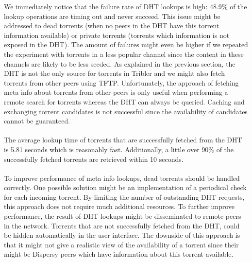 We immediately notice that the failure rate of DHT lookups is high: 48.9\% of the lookup operations are timing out and never succeed. This issue might be addressed to dead torrents (when no peers in the DHT have this torrent information available) or private torrents (torrents which information is not exposed in the DHT). The amount of failures might even be higher if we repeated the experiment with torrents in a less popular channel since the content in these channels are likely to be less seeded. As explained in the previous section, the DHT is not the only source for torrents in Tribler and we might also fetch torrents from other peers using TFTP. Unfortunately, the approach of fetching meta info about torrents from other peers is only useful when performing a remote search for torrents whereas the DHT can always be queried. Caching and exchanging torrent candidates is not successful since the availability of candidates cannot be guaranteed.\\\\
The average lookup time of torrents that are successfully fetched from the DHT is 5.81 seconds which is reasonably fast. Additionally, a little over 90\% of the successfully fetched torrents are retrieved within 10 seconds.\\\\
To improve performance of meta info lookups, dead torrents should be handled correctly. One possible solution might be an implementation of a periodical check for each incoming torrent. By limiting the number of outstanding DHT requests, this approach does not require much additional resources. To further improve performance, the result of DHT lookups might be disseminated to remote peers in the network. Torrents that are not successfully fetched from the DHT, could be hidden automatically in the user interface. The downside of this approach is that it might not give a realistic view of the availability of a torrent since their might be Dispersy peers which have information about this torrent available.